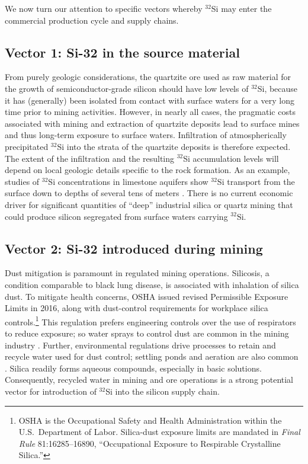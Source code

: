 \documentclass[final,5p]{elsarticle}
\def\si{$^{32}$Si\xspace}
\begin{document}
We now turn our attention to specific vectors whereby \si may enter the commercial production cycle and supply chains.

\subsection{Vector 1: Si-32 in the source material}\label{ssec:vector1}
From purely geologic considerations, the quartzite ore used as raw material for the growth of semiconductor-grade silicon should have low levels of \si, because it has (generally) been isolated from contact with surface waters for a very long time prior to mining activities. However, in nearly all cases, the pragmatic costs associated with mining and extraction of quartzite deposits lead to surface mines and thus long-term exposure to surface waters. Infiltration of atmospherically precipitated \si into the strata of the quartzite deposits is therefore expected. The extent of the infiltration and the resulting \si accumulation levels will depend on local geologic details specific to the rock formation. As an example, studies of \si concentrations in limestone aquifers show \si transport from the surface down to depths of several tens of meters \cite{MORGENSTERN}. There is no current economic driver for significant quantities of ``deep'' industrial silica or quartz mining that could produce silicon segregated from surface waters carrying \si.

\subsection{Vector 2: Si-32 introduced during mining}\label{ssec:vector2}
Dust mitigation is paramount in regulated mining operations. Silicosis, a condition comparable to black lung disease, is associated with inhalation of silica dust. To mitigate health concerns, OSHA issued revised Permissible Exposure Limits in 2016, along with dust-control requirements for workplace silica controls.\footnote{OSHA is the Occupational Safety and Health Administration within the U.S.\ Department of Labor.  Silica-dust exposure limits are mandated in \textit{Final Rule} 81:16285--16890, ``Occupational Exposure to Respirable Crystalline Silica.''} This regulation prefers engineering controls over the use of respirators to reduce exposure; so water sprays to control dust are common in the mining industry \cite{niosh}. Further, environmental regulations drive processes to retain and recycle water used for dust control; settling ponds and aeration are also common \cite{EPA}. Silica readily forms aqueous compounds, especially in basic solutions. Consequently, recycled water in mining and ore operations is a strong potential vector for introduction of \si into the silicon supply chain. 
\end{document}
